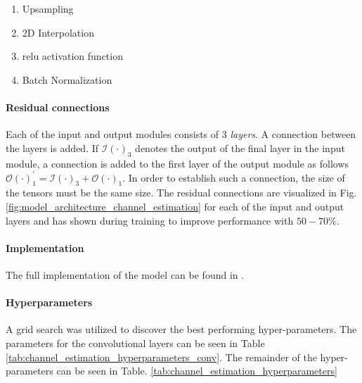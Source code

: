 \begin{enumerate}
    \item Upsampling
    \item 2D Interpolation
    \item \gls{relu} activation function
    \item Batch Normalization
\end{enumerate}


\paragraph{Residual connections}
Each of the input and output modules consists of 3 \emph{layers}. A connection between the layers is added. If $\mathcal{I}(\cdot)_3$ denotes the output of the final layer in the input module, a connection is added to the first layer of the output module as follows $\mathcal{O}(\cdot)_{1}^{'} = \mathcal{I}(\cdot)_3  + \mathcal{O}(\cdot)_1$. In order to establish such a connection, the size of the tensors must be the same size. The residual connections are visualized in Fig. \ref{fig:model_architecture_channel_estimation} for each of the input and output layers and has shown during training to improve performance with $50-70\%$.

\paragraph{Implementation}
The full implementation of the model can be found in \cite{Thrane2020RepositoryLearning}.


\paragraph{Hyperparameters}
A grid search was utilized to discover the best performing hyper-parameters. The parameters for the convolutional layers can be seen in Table \ref{tab:channel_estimation_hyperparameters_conv}. The remainder of the hyper-parameters can be seen in Table. \ref{tab:channel_estimation_hyperparameters}


